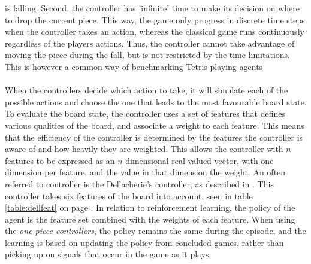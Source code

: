 is falling. Second, the controller has 'infinite'
time to make its decision on where to drop the current piece.
This way, the game only progress in discrete time steps
when the controller takes
an action, whereas the classical game runs continuously 
regardless of the players actions.
Thus, the controller cannot take advantage of moving the piece 
during the fall, but is not restricted by the time limitations.
This is however a common way of benchmarking Tetris playing agents
\citep{scherrer2009}\\
\\
When the controllers decide which action to take, it will
simulate each of the possible actions and choose the one that
leads to the most favourable board state. To evaluate the board 
state, the controller uses a set of features that defines 
various qualities of the board, and associate a weight to each 
feature. This means that the efficiency of the controller 
is determined by the features the controller is aware of
and how heavily they are weighted. This allows
the controller with $n$ features to be expressed as an 
$n$ dimensional real-valued vector, with one dimension 
per feature, and the value in that dimension the weight.
An often referred to controller is the Dellacherie's controller, 
as described in \cite{scherrer2009}. This controller
takes six features of the board into account, seen in table 
\ref{table:dellfeat} on page \pageref{table:dellfeat}. In relation 
to reinforcement learning, the policy of the agent is the feature set
combined with the weights of each feature. 
When using the \textit{one-piece controllers}, the policy remains 
the same during the episode, and the learning is based on updating
the policy from concluded games, rather than picking up on signals
that occur in the game as it plays.





